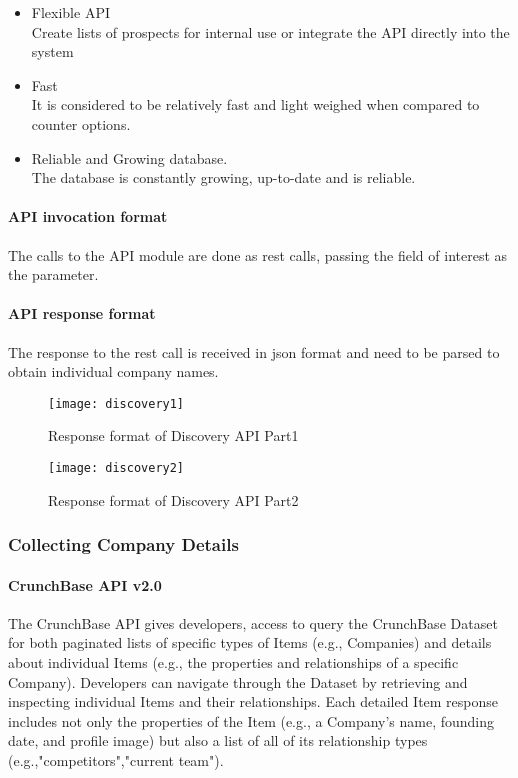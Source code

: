 \begin{itemize}
\item Flexible API \\ Create lists of prospects for internal use or integrate the API directly into the system
\item Fast \\ It is considered to be relatively fast and light weighed when compared to counter options.
\item Reliable and Growing database. \\The database is constantly growing, up-to-date and is reliable.
\end{itemize}
\paragraph*{API invocation format}
\hfill
\par The calls to the API module are done as rest calls, passing the field of interest as the parameter.
\paragraph*{API response format}
\hfill \break
The response to the rest call is received in json format and need to be parsed to obtain individual company names.
\begin{figure}[h]
	\texttt{[image: discovery1]}
	\centering
	\caption{Response format of Discovery API Part1}
\end{figure}
\begin{figure}[h]
	\texttt{[image: discovery2]}
	\centering
	\caption{Response format of Discovery API Part2}
\end{figure}
\subsubsection{Collecting Company Details}
\paragraph*{CrunchBase API v2.0}
\hfill \break
The CrunchBase API gives developers, access to query the CrunchBase Dataset for both paginated lists of specific types of Items (e.g., Companies) and details about individual Items (e.g., the properties and relationships of a specific Company).
Developers can navigate through the Dataset by retrieving and inspecting individual Items and their relationships. Each detailed Item response includes not only the properties of the Item (e.g., a Company's name, founding date, and profile image) but also a list of all of its relationship types (e.g.,"competitors","current team").\cite{clearbit}
